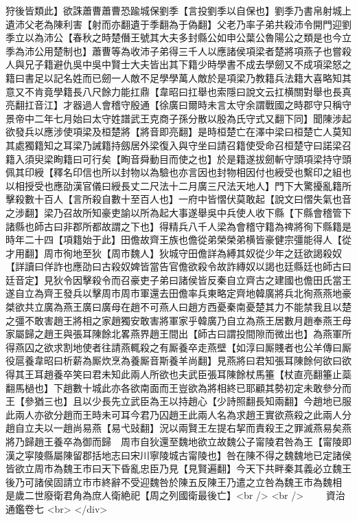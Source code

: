 狩後皆類此】欲誅蕭曹蕭曹恐踰城保劉季【言投劉季以自保也】劉季乃書帛射城上遺沛父老為陳利害【射而亦翻遺于季翻為于偽翻】父老乃率子弟共殺沛令開門迎劉季立以為沛公【春秋之時楚僭王號其大夫多封縣公如申公葉公魯陽公之類是也今立季為沛公用楚制也】蕭曹等為收沛子弟得三千人以應諸侯項梁者楚將項燕子也嘗殺人與兄子籍避仇吳中吳中賢士大夫皆出其下籍少時學書不成去學劒又不成項梁怒之籍曰書足以記名姓而已劒一人敵不足學學萬人敵於是項梁乃教籍兵法籍大喜略知其意又不肯竟學籍長八尺餘力能扛鼎【韋昭曰扛舉也索隱曰說文云扛横關對舉也長真亮翻扛音江】才器過人會稽守殷通【徐廣曰爾時未言太守余謂戰國之時郡守只稱守景帝中二年七月始曰太守姓譜武王克商子孫分散以殷為氏守式又翻下同】聞陳涉起欲發兵以應涉使項梁及桓楚將【將音即亮翻】是時桓楚亡在澤中梁曰桓楚亡人莫知其處獨籍知之耳梁乃誡籍持劔居外梁復入與守坐曰請召籍使受命召桓楚守曰諾梁召籍入須臾梁眴籍曰可行矣【眴音舜動目而使之也】於是籍遂拔劒斬守頭項梁持守頭佩其印綬【釋名印信也所以封物以為驗也亦言因也封物相因付也綬受也繫印之組也以相授受也應劭漢官儀曰綬長丈二尺法十二月廣三尺法天地人】門下大驚擾亂籍所擊殺數十百人【言所殺自數十至百人也】一府中皆慴伏莫敢起【說文曰慴失氣也音之涉翻】梁乃召故所知豪吏諭以所為起大事遂舉吳中兵使人收下縣【下縣會稽管下諸縣也師古曰非郡所都故謂之下也】得精兵八千人梁為會稽守籍為禆將徇下縣籍是時年二十四【項籍始于此】田儋故齊王族也儋從弟榮榮弟横皆豪健宗彊能得人【從才用翻】周市徇地至狄【周市魏人】狄城守田儋詳為縛其奴從少年之廷欲謁殺奴【詳讀曰佯詐也應劭曰古殺奴婢皆當告官儋欲殺令故詐縳奴以謁也廷縣廷也師古曰廷音定】見狄令因擊殺令而召豪吏子弟曰諸侯皆反秦自立齊古之建國也儋田氏當王遂自立為齊王發兵以擊周市周市軍還去田儋率兵東略定齊地韓廣將兵北徇燕燕地豪桀欲共立廣為燕王廣曰廣母在趙不可燕人曰趙方西憂秦南憂楚其力不能禁我且以楚之彊不敢害趙王將相之家趙獨安敢害將軍家乎韓廣乃自立為燕王居數月趙奉燕王母家屬歸之趙王與張耳陳餘北畧燕界趙王間出【師古曰謂投間隙而微出也】為燕軍所得燕囚之欲求割地使者往請燕輒殺之有厮養卒走燕壁【如淳曰厮賤者也公羊傳曰厮役扈養韋昭曰析薪為厮炊烹為養厮音斯養羊尚翻】見燕將曰君知張耳陳餘何欲曰欲得其王耳趙養卒笑曰君未知此兩人所欲也夫武臣張耳陳餘杖馬箠【杖直亮翻箠止蘂翻馬檛也】下趙數十城此亦各欲南面而王豈欲為將相終已耶顧其勢初定未敢參分而王【參猶三也】且以少長先立武臣為王以持趙心【少詩照翻長知兩翻】今趙地已服此兩人亦欲分趙而王時未可耳今君乃囚趙王此兩人名為求趙王實欲燕殺之此兩人分趙自立夫以一趙尚易燕【易弋䜴翻】況以兩賢王左提右挈而責殺王之罪滅燕易矣燕將乃歸趙王養卒為御而歸　周市自狄還至魏地欲立故魏公子甯陵君咎為王【甯陵即漢之寜陵縣屬陳留郡括地志曰宋川寧陵城古甯陵也】咎在陳不得之魏魏地已定諸侯皆欲立周市為魏王市曰天下昏亂忠臣乃見【見賢遍翻】今天下共畔秦其義必立魏王後乃可諸侯固請立市市終辭不受迎魏咎於陳五反陳王乃遣之立咎為魏王市為魏相　是歲二世廢衛君角為庶人衛絶祀【周之列國衛最後亡】<br />
<br />
　　資治通鑑卷七  <br>
   </div> 

